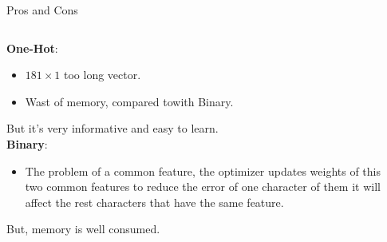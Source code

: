 \documentclass[10pt]{beamer}
\begin{document}
\begin{frame}[fragile]{Pros and Cons}


\begin{columns}
\begin{column}{0.7\textwidth}
\textbf{One-Hot}:
\begin{itemize}
    \item $181 \times 1$ too long vector.
    \item Wast of memory, compared towith Binary.
\end{itemize}
But it's very informative and easy to learn.\\[0.7cm]

\textbf{Binary}:
\begin{itemize}
    \item The problem of a common feature, the optimizer updates weights of this two common features to reduce the error of one character of them it will affect the rest characters that have the same feature.
\end{itemize}
But, memory is well consumed.
\end{column}
\begin{column}{0.35\textwidth}
\begin{center}

\end{center}
\end{column}
\end{columns}
\end{frame}
\end{document}
